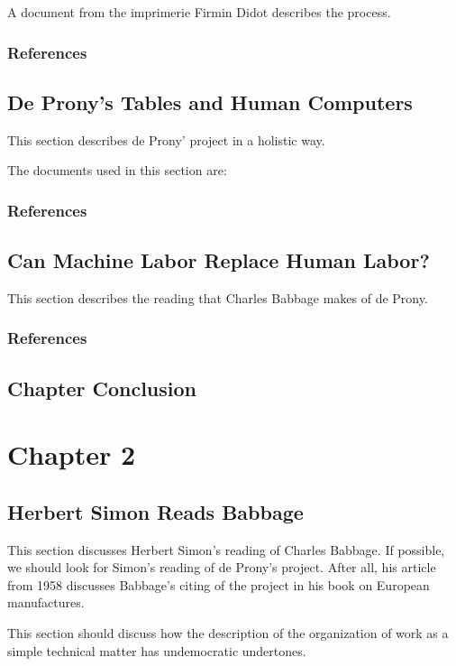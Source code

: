 \documentclass[version=last,draft=true,paper=A4,portrait,twoside=true,twocolumn=true,headinclude=false,footinclude=false,fontsize=10,BCOR=20mm,DIV=13,pagesize=auto,titlepage=false,mpinclude=false,open=right,chapterprefix=true,numbers=autoendperiod,headsepline=false,parskip=false]{scrbook}
\begin{document}
A document from the imprimerie Firmin Didot describes the process.

\subsection*{References}
\printbibliography[heading=none,keyword=chapter-1]
\section{De Prony's Tables and Human Computers}
\label{sec:orga99870b}
This section describes de Prony' project in a holistic way. 

The documents used in this section are:

\subsection*{References}
\printbibliography[heading=none,keyword=chapter-1.1]
\section{Can Machine Labor Replace Human Labor?}
\label{sec:org78b52c3}
This section describes the reading that Charles Babbage makes of de Prony. 

\subsection*{References}
\printbibliography[heading=none,keyword=chapter-1.2]
\section{Chapter Conclusion}
\label{sec:org82e422f}
\chapter{Chapter 2}
\label{sec:orge211475}
\section{Herbert Simon Reads Babbage}
\label{sec:org9e2d3ce}
This section discusses Herbert Simon's reading of Charles Babbage. If
possible, we should look for Simon's reading of de Prony's project. After
all, his article from 1958 discusses Babbage's citing of the project in his
book on European manufactures.

This section should discuss how the description of the organization of work
as a simple technical matter has undemocratic undertones. 
\end{document}
